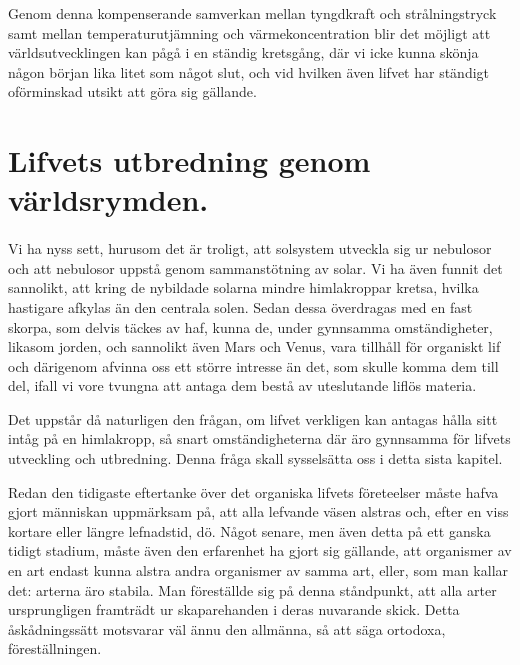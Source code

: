 \documentclass[a4paper, 12pt, oneside, swedish]{article}
\begin{document}
Genom denna kompenserande samverkan mellan tyngdkraft och strålningstryck samt mellan temperaturutjämning och värmekoncentration blir det möjligt att världsutvecklingen kan pågå i en ständig kretsgång, där vi icke kunna skönja någon början lika litet som något slut, och vid hvilken även lifvet har ständigt oförminskad utsikt att göra sig gällande.
\clearpage
\section{Lifvets utbredning genom världsrymden.}
\paragraph{}
Vi ha nyss sett, hurusom det är troligt, att solsystem utveckla sig ur nebulosor och att nebulosor uppstå genom sammanstötning av solar. Vi ha även funnit det sannolikt, att kring de nybildade solarna mindre himlakroppar kretsa, hvilka hastigare afkylas än den centrala solen. Sedan dessa överdragas med en fast skorpa, som delvis täckes av haf, kunna de, under gynnsamma omständigheter, likasom jorden, och sannolikt även Mars och Venus, vara tillhåll för organiskt lif och därigenom afvinna oss ett större intresse än det, som skulle komma dem till del, ifall vi vore tvungna att antaga dem bestå av uteslutande liflös materia.

Det uppstår då naturligen den frågan, om lifvet verkligen kan antagas hålla sitt intåg på en himlakropp, så snart omständigheterna där äro gynnsamma för lifvets utveckling och utbredning. Denna fråga skall sysselsätta oss i detta sista kapitel.

Redan den tidigaste eftertanke över det organiska lifvets företeelser måste hafva gjort människan uppmärksam på, att alla lefvande väsen alstras och, efter en viss kortare eller längre lefnadstid, dö. Något senare, men även detta på ett ganska tidigt stadium, måste även den erfarenhet ha gjort sig gällande, att organismer av en art endast kunna alstra andra organismer av samma art, eller, som man kallar det: arterna äro stabila. Man föreställde sig på denna ståndpunkt, att alla arter ursprungligen framträdt ur skaparehanden i deras nuvarande skick. Detta åskådningssätt motsvarar väl ännu den allmänna, så att säga ortodoxa, föreställningen.
\end{document}
